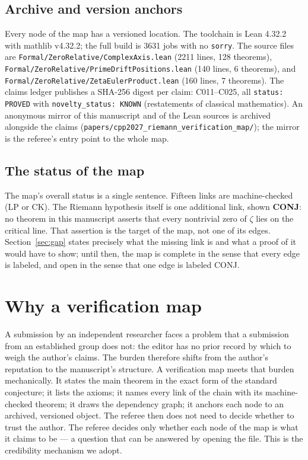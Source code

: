 \documentclass[sigplan,10pt,anonymous,review]{acmart}
\begin{document}
\subsection{Archive and version anchors}

Every node of the map has a versioned location. The toolchain is Lean
4.32.2 with mathlib v4.32.2; the full build is 3631 jobs with no
\texttt{sorry}. The source files are
\texttt{Formal/ZeroRelative/ComplexAxis.lean} (2211 lines, 128
theorems), \texttt{Formal/ZeroRelative/PrimeDriftPositions.lean} (140
lines, 6 theorems), and \texttt{Formal/ZeroRelative/ZetaEulerProduct.lean}
(160 lines, 7 theorems). The claims ledger publishes a SHA-256 digest
per claim: C011--C025, all \texttt{status: PROVED} with
\texttt{novelty\_status: KNOWN} (restatements of classical mathematics).
An anonymous mirror of this manuscript and of the Lean sources is
archived alongside the claims
(\texttt{papers/cpp2027\_riemann\_verification\_map/}); the mirror is
the referee's entry point to the whole map.

\subsection{The status of the map}

The map's overall status is a single sentence. Fifteen links are
machine-checked (\textcolor{proved}{LP} or
\textcolor{classical}{CK}). The Riemann hypothesis itself is one
additional link, shown \textcolor{conj}{\textbf{CONJ}}: no theorem in
this manuscript asserts that every nontrivial zero of $\zeta$ lies on
the critical line. That assertion is the target of the map, not one of
its edges. Section~\ref{sec:gap} states precisely what the missing link
is and what a proof of it would have to show; until then, the map is
complete in the sense that every edge is labeled, and open in the sense
that one edge is labeled \textcolor{conj}{CONJ}.

\section{Why a verification map}

A submission by an independent researcher faces a problem that a
submission from an established group does not: the editor has no prior
record by which to weigh the author's claims. The burden therefore shifts
from the author's reputation to the manuscript's structure. A verification
map meets that burden mechanically. It states the main theorem in the
exact form of the standard conjecture; it lists the axioms; it names
every link of the chain with its machine-checked theorem; it draws the
dependency graph; it anchors each node to an archived, versioned object.
The referee then does not need to decide whether to trust the author. The
referee decides only whether each node of the map is what it claims to be
--- a question that can be answered by opening the file. This is the
credibility mechanism we adopt.
\end{document}
